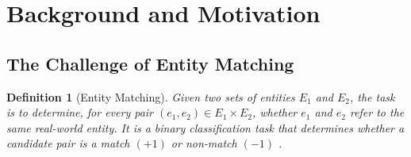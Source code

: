 \documentclass[11pt, a4paper]{article}
\theoremstyle{boxed}
\newtheorem{innerdefinition}{Definition}[section]
\newtheorem{innerproblem}{Problem}[section]
\newtheorem{innerexample}{Example}[section]
\newtheorem{innerremark}{Remark}[section]
\newenvironment{definition}
  {\begin{mdframed}[style=defstyle]\begin{innerdefinition}}
  {\end{innerdefinition}\end{mdframed}}
\newenvironment{problem}
  {\begin{mdframed}[style=propstyle]\begin{innerproblem}}
  {\end{innerproblem}\end{mdframed}}
\newenvironment{example}
  {\begin{mdframed}[style=thmstyle]\begin{innerexample}}
  {\end{innerexample}\end{mdframed}}
\newenvironment{remark}
  {\begin{mdframed}[style=notestyle]\begin{innerremark}}
  {\end{innerremark}\end{mdframed}}
\newcommand{\R}{\mathbb{R}}
\newcommand{\kstar}{k^{*}}
\begin{document}



\section{Background and Motivation}
\subsection{The Challenge of Entity Matching}
\begin{definition}[Entity Matching]
  Given two sets of entities  $E_1$  and $E_2$, the task is to determine, for every pair $(e_1, e_2) \in E_1 \times E_2$, whether $e_1$ and $e_2$ refer to the same real-world entity. It is a binary classification task that determines whether a candidate pair is a match $(+1)$ or non-match $(-1)$ \cite{tao26}.
\end{definition}
\end{document}
